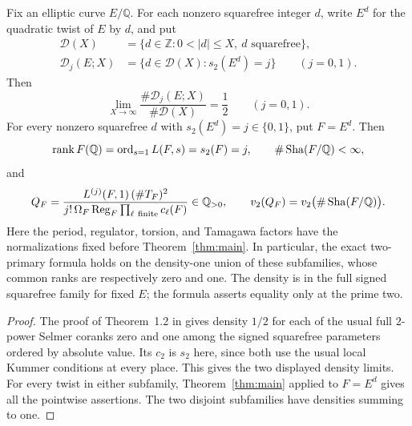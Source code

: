 \begin{corollary}
\label{cor:quadratic-twist-density}
Fix an elliptic curve \(E/\mathbb Q\). For each nonzero squarefree integer
\(d\), write \(E^d\) for the quadratic twist of \(E\) by \(d\), and put
\[
 \begin{aligned}
 \mathcal D(X)&=\{d\in\mathbb Z:0<|d|\le X,\ d\text{ squarefree}\},\\
 \mathcal D_j(E;X)&=\{d\in\mathcal D(X):s_2(E^d)=j\}
 \qquad(j=0,1).
 \end{aligned}
\]
Then
\[
 \lim_{X\to\infty}\frac{\#\mathcal D_j(E;X)}{\#\mathcal D(X)}
 =\frac12\qquad(j=0,1).
\]
For every nonzero squarefree \(d\) with \(s_2(E^d)=j\in\{0,1\}\), put
\(F=E^d\). Then
\[
 \operatorname{rank}F(\mathbb Q)
 =\operatorname{ord}_{s=1}L(F,s)=s_2(F)=j,
 \qquad \#\operatorname{Sha}(F/\mathbb Q)<\infty,
\]
and
\[
 Q_F=\frac{L^{(j)}(F,1)\,(\#T_F)^2}
 {j!\,\Omega_F\operatorname{Reg}_F\prod_{\ell\ \mathrm{finite}}c_\ell(F)}
 \in\mathbb Q_{>0},
 \qquad v_2(Q_F)=v_2\bigl(\#\operatorname{Sha}(F/\mathbb Q)\bigr).
\]
Here the period, regulator, torsion, and Tamagawa factors have the
normalizations fixed before Theorem~\ref{thm:main}. In particular, the
exact two-primary formula holds on the density-one union of these
subfamilies, whose common ranks are respectively zero and one. The
density is in the full signed squarefree family for fixed \(E\); the
formula asserts equality only at the prime two.
\end{corollary}

\begin{proof}
The proof of Theorem~1.2 in \cite{OpenAIGoldfeldDensity2026} gives density
\(1/2\) for each of the usual full \(2\)-power Selmer coranks zero and
one among the signed squarefree parameters ordered by absolute value.
Its \(c_2\) is \(s_2\) here, since both use the usual local Kummer
conditions at every place. This gives the two displayed density limits.
For every twist in either subfamily, Theorem~\ref{thm:main} applied to
\(F=E^d\) gives all the pointwise assertions. The two disjoint
subfamilies have densities summing to one.
\end{proof}
